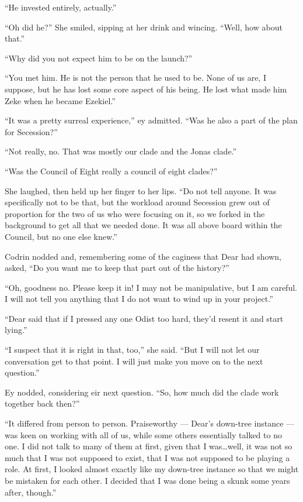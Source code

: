 ``He invested entirely, actually.''

``Oh did he?'' She smiled, sipping at her drink and wincing. ``Well, how about that.''

``Why did you not expect him to be on the launch?''

``You met him. He is not the person that he used to be. None of us are, I suppose, but he has lost some core aspect of his being. He lost what made him Zeke when he became Ezekiel.''

``It was a pretty surreal experience,'' ey admitted. ``Was he also a part of the plan for Secession?''

``Not really, no. That was mostly our clade and the Jonas clade.''

``Was the Council of Eight really a council of eight clades?''

She laughed, then held up her finger to her lips. ``Do not tell anyone. It was specifically not to be that, but the workload around Secession grew out of proportion for the two of us who were focusing on it, so we forked in the background to get all that we needed done. It was all above board within the Council, but no one else knew.''

Codrin nodded and, remembering some of the caginess that Dear had shown, asked, ``Do you want me to keep that part out of the history?''

``Oh, goodness no. Please keep it in! I may not be manipulative, but I am careful. I will not tell you anything that I do not want to wind up in your project.''

``Dear said that if I pressed any one Odist too hard, they'd resent it and start lying.''

``I suspect that it is right in that, too,'' she said. ``But I will not let our conversation get to that point. I will just make you move on to the next question.''

Ey nodded, considering eir next question. ``So, how much did the clade work together back then?''

``It differed from person to person. Praiseworthy — Dear's down-tree instance — was keen on working with all of us, while some others essentially talked to no one. I did not talk to many of them at first, given that I was\ldots well, it was not so much that I was not supposed to exist, that I was not supposed to be playing a role. At first, I looked almost exactly like my down-tree instance so that we might be mistaken for each other. I decided that I was done being a skunk some years after, though.''

